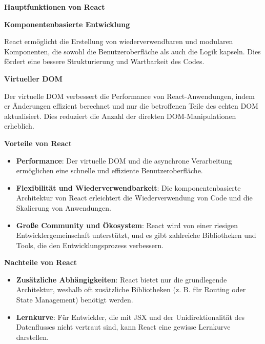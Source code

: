 \textbf{Hauptfunktionen von React}

\textbf{Komponentenbasierte Entwicklung} 

React ermöglicht die Erstellung von wiederverwendbaren und modularen Komponenten, die sowohl die Benutzeroberfläche als auch die Logik kapseln. Dies fördert eine bessere Strukturierung und Wartbarkeit des Codes.\textit{\cite{shetty2020review, react}}

\textbf{Virtueller DOM} 

Der virtuelle DOM verbessert die Performance von React-Anwendungen, indem er Änderungen effizient berechnet und nur die betroffenen Teile des echten DOM aktualisiert. Dies reduziert die Anzahl der direkten DOM-Manipulationen erheblich.\textit{\cite{rathinam2022analysis, hutagikar2020analysis, react}}

\textbf{Vorteile von React}
\begin{itemize}
	\item \textbf{Performance}: Der virtuelle DOM und die asynchrone Verarbeitung ermöglichen eine schnelle und effiziente Benutzeroberfläche.\textit{\cite{rathinam2022analysis, react}}
	
	\item \textbf{Flexibilität und Wiederverwendbarkeit}: Die komponentenbasierte Architektur von React erleichtert die Wiederverwendung von Code und die Skalierung von Anwendungen.\textit{\cite{hutagikar2020analysis, react}}
	
	\item \textbf{Große Community und Ökosystem}: React wird von einer riesigen Entwicklergemeinschaft unterstützt, und es gibt zahlreiche Bibliotheken und Tools, die den Entwicklungsprozess verbessern.\textit{\cite{shetty2020review, react}}
\end{itemize}

\textbf{Nachteile von React}
\begin{itemize}
	\item \textbf{Zusätzliche Abhängigkeiten}: React bietet nur die grundlegende Architektur, weshalb oft zusätzliche Bibliotheken (z. B. für Routing oder State Management) benötigt werden.\textit{\cite{shetty2020review, rathinam2022analysis, react_blog}}
	
	\item \textbf{Lernkurve}: Für Entwickler, die mit JSX und der Unidirektionalität des Datenflusses nicht vertraut sind, kann React eine gewisse Lernkurve darstellen.\textit{\cite{hutagikar2020analysis, react_blog}}
\end{itemize}



